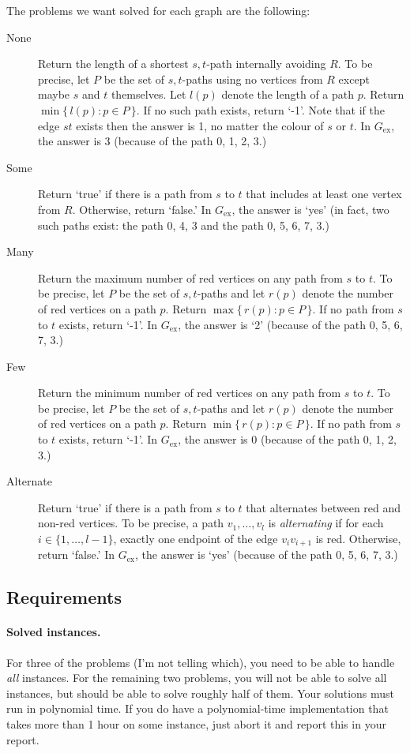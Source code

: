 \documentclass{tufte-handout}
\begin{document}
The problems we want solved for each graph are the following:
\begin{description}
  \item[None] Return the length of a shortest $s,t$-path internally avoiding $R$.
    To be precise, let $P$ be the set of $s,t$-paths using no vertices from $R$ except maybe $s$ and $t$ themselves. Let $l(p)$ denote the length of a path $p$.
    Return $\min\{\,l(p)\colon p\in P\,\}$.
    If no such path exists, return `-1'.
    Note that if the edge $st$ exists then the answer is 1, no matter the colour of $s$ or $t$.
    In $G_{\text{ex}}$, the answer is 3 (because of the path 0, 1, 2, 3.)
  \item[Some] Return `true' if there is a path from $s$ to $t$ that includes at least one vertex from $R$.
    Otherwise, return `false.'
    In $G_{\text{ex}}$, the answer is `yes' (in fact, two such paths exist: the path 0, 4, 3 and the path 0, 5, 6, 7, 3.)
  \item [Many] Return the maximum number of red vertices on any path from $s$ to $t$.
    To be precise, let $P$ be the set of $s,t$-paths and let $r(p)$ denote the number of red vertices  on a path $p$.
    Return $\max\{\,r(p)\colon p\in P\,\}$.
    If no path from $s$ to $t$ exists, return `-1'.
    In $G_{\text{ex}}$, the answer is `2' (because of the path 0, 5, 6, 7, 3.)
  \item [Few] Return the minimum number of red vertices on any path from $s$ to $t$.
    To be precise, let $P$ be the set of $s,t$-paths and let $r(p)$ denote the number of red vertices  on a path $p$.
    Return $\min\{\,r(p)\colon p\in P\,\}$.
    If no path from $s$ to $t$ exists, return `-1'.
    In $G_{\text{ex}}$, the answer is 0 (because of the path 0, 1, 2, 3.)
  \item [Alternate] Return `true' if there is a path from $s$ to $t$ that alternates between red and non-red vertices.
    To be precise, a path $v_1,\ldots, v_l$ is \emph{alternating} if for each $i\in\{1,\ldots,l-1\}$, exactly one endpoint of the edge $v_iv_{i+1}$ is red.
    Otherwise, return `false.'
    In $G_{\text{ex}}$, the answer is `yes' (because of the path 0, 5, 6, 7, 3.)
\end{description}

\subsection{Requirements}
\paragraph{Solved instances.}
For three of the problems (I’m not telling which), you need to be able to handle \emph{all} instances.
For the remaining two problems, you will not be able to solve all instances, but should be able to solve roughly half of them.
Your solutions must run in polynomial time. 
If you do have a polynomial-time implementation that takes more than 1 hour on some instance, just abort it and report this in your report.
\end{document}
